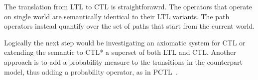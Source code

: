 The translation from \ac{LTL} to \ac{CTL} is straightforawrd. The operators that operate on single world are
semantically identical to their \ac{LTL} variants. The path operators instead quantify over the set of paths that start
from the current world.

Logically the next step would be investigating an axiomatic system for \ac{CTL} or extending the semantic to \ac{CTL}* a
superset of both \ac{LTL} and \ac{CTL}. Another approach is to add a probability measure to the transitions in the
counterpart model, thus adding a probability operator, as in \ac{PCTL}~\cite{brazdil_satisfiability_2008}.
